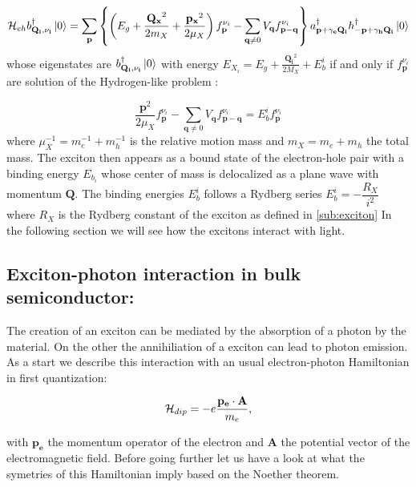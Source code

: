 \begin{equation}
    \begin{align}
    \mathcal{H}_{eh}b^{\dagger}_{\mathbf{Q_i,\nu_i}}\ket{0} = \sum_{\mathbf{p}}  \left\{\left(E_g + \dfrac{\mathbf{Q_x}^2}{2m_X} + \dfrac{\mathbf{p_x}^2}{2\mu_X} \right)f_{\mathbf{p}}^{\nu_i} - \sum_{\mathbf{q}\neq 0} V_\mathbf{q}f_{\mathbf{p-q}}^{\nu_i}\right\}a^{\dagger}_{\mathbf{p+\gamma_e\mathbf{Q_i}}}h^{\dagger}_{\mathbf{-p+\gamma_h\mathbf{Q_i}}}\ket{0}
    \end{align}
\end{equation}
whose eigenstates are $b^{\dagger}_{\mathbf{Q_i,\nu_i}}\ket{0}$ with energy $E_{X_i} = E_g + \frac{\mathbf{Q_i}^2}{2M_X} + E_{b}^i$ if and only if $f_{\mathbf{p}}^{\nu_i}$ are solution of the Hydrogen-like problem : 

\begin{equation}
    \dfrac{\mathbf{p}^2}{2\mu_X}f_{\mathbf{p}}^{\nu_i} -\sum_{\mathbf{q}\neq 0} V_\mathbf{q}f_{\mathbf{p-q}}^{\nu_i} = E_b^if_{\mathbf{p}}^{\nu_i}
    \label{eq:hydrogen_like_problem}
\end{equation}
 where $\mu_X^{-1}= m_e^{-1}+m_h^{-1}$ is the relative motion mass and $m_X = m_e+m_h$ the total mass. The exciton then appears as a bound state of the electron-hole pair with a binding energy $E_{b_i}$ whose center of mass 
 is delocalized as a plane wave with momentum $\mathbf{Q}$. The binding energies $E_b^i$ follows a Rydberg series $E_b^i = -\dfrac{R_X}{i^2} $ where $R_X$ is the Rydberg constant of the exciton as defined in \autoref{sub:exciton}
In the following section we will see how the excitons interact with light.

 \subsection{Exciton-photon interaction in bulk semiconductor:} 
 \label{sub:exciton_photon_interaction}
The creation of an exciton can be mediated by the absorption of a photon by the material. On the other the annihiliation of a exciton can lead to photon emission.
As a start we describe this interaction with an usual electron-photon Hamiltonian in first quantization:


\begin{equation}
    \mathcal{H}_{dip} = -e \dfrac{\mathbf{p_e} \cdot \mathbf{A}}{m_e},
\end{equation}

with $\mathbf{p_e}$ the momentum operator of the electron and $\mathbf{A}$ the potential vector of the electromagnetic field. Before going further let us have a look at what the symetries of this Hamiltonian imply based on the Noether theorem.

